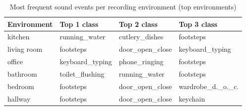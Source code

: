 \documentclass{article}
\begin{document}
 
\begin{table}[!h]
  \caption{Most frequent sound events per recording environment (top environments)}
  \label{tab:envevents}
  \centering
  \small
  \begin{tabular}{llll}
    \toprule
    Environment & Top 1 class & Top 2 class & Top 3 class \\
    \midrule
    kitchen      & running\_water     & cutlery\_dishes   & footsteps \\
    living room  & footsteps          & door\_open\_close  & keyboard\_typing \\
    office       & keyboard\_typing   & phone\_ringing     & footsteps \\
    bathroom     & toilet\_flushing   & running\_water     & footsteps \\
    bedroom      & footsteps          & door\_open\_close  & wardrobe\_d.\_o.\_c. \\
    hallway      & footsteps          & door\_open\_close  & keychain \\
    \bottomrule
  \end{tabular}
\end{table}
 
 
\end{document}
